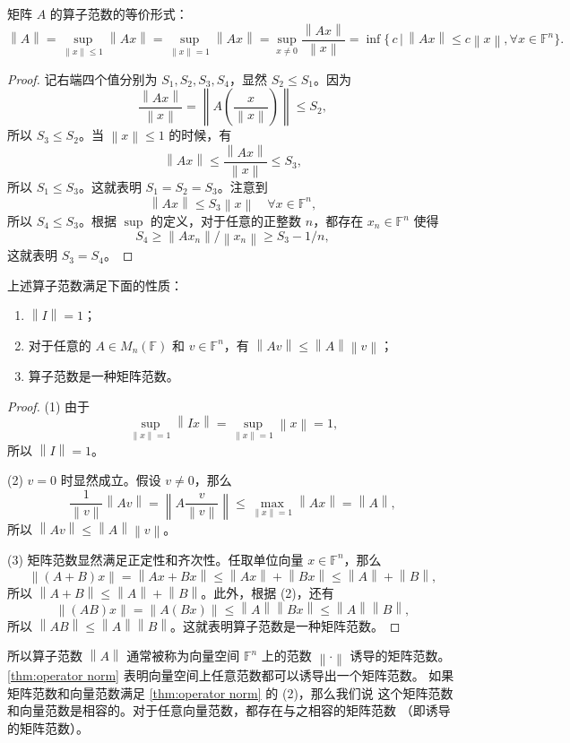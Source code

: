 \documentclass[fontset=none,zihao=-4]{Notes}
\newcommand{\norm}[1]{\left\lVert#1\right\rVert}
\begin{document}
\begin{proposition}
  矩阵 $A$ 的算子范数的等价形式：
  \[
    \norm{A}=\sup_{\norm{x}\leq 1}\norm{A x}=\sup_{\norm{x}=1}\norm{Ax}
    =\sup_{x\neq 0}\frac{\norm{Ax}}{\norm{x}}=\inf\bigl\{\,c\,|\, \norm{Ax}\leq c\norm x,\forall x\in \mathbb{F}^n\bigr\}.
  \]
\end{proposition}
\begin{proof}
  记右端四个值分别为 $S_1,S_2,S_3,S_4$，显然 $S_2\leq S_1$。因为
  \[
    \frac{\norm{Ax}}{\norm x}=\norm{A\left(\frac{x}{\norm x}\right)}\leq S_2,  
  \]
  所以 $S_3\leq S_2$。当 $\norm{x}\leq 1$ 的时候，有
  \[
    \norm{Ax}\leq \frac{\norm{Ax}}{\norm x}\leq S_3,  
  \]
  所以 $S_1\leq S_3$。这就表明 $S_1=S_2=S_3$。注意到
  \[
    \norm{Ax}\leq S_3\norm{x}\quad \forall x\in \mathbb{F}^n,  
  \]
  所以 $S_4\leq S_3$。根据 $\sup$ 的定义，对于任意的正整数 $n$，都存在
  $x_n\in \mathbb{F}^n$ 使得
  \[
    S_4\geq \norm{Ax_n}/\norm{x_n}\geq S_3-1/n,  
  \]
  这就表明 $S_3=S_4$。
\end{proof}

\begin{theorem}\label{thm:operator norm}
  上述算子范数满足下面的性质：
  \begin{enumerate}
    \item $\norm{I}=1$；
    \item 对于任意的 $A\in M_n(\mathbb{F})$ 和 $v\in\mathbb{F}^n$，有
    $\norm{Av}\leq\norm{A}\norm{v}$；
    \item 算子范数是一种矩阵范数。
  \end{enumerate}
\end{theorem}
\begin{proof}
  (1) 由于
  \[
    \sup_{\norm{x}=1}\norm{Ix}=\sup_{\norm{x}=1}\norm{x}=1,  
  \]
  所以 $\norm{I}=1$。

  (2) $v=0$ 时显然成立。假设 $v\neq 0$，那么
  \[
    \frac{1}{\norm{v}}\norm{Av}=\norm{A\frac{v}{\norm{v}}}\leq\max_{\norm{x}=1}\norm{Ax}=\norm{A},  
  \]
  所以 $\norm{Av}\leq\norm{A}\norm{v}$。

  (3) 矩阵范数显然满足正定性和齐次性。任取单位向量 $x\in\mathbb{F}^n$，那么
  \[
    \norm{(A+B)x}=\norm{Ax+Bx}\leq\norm{Ax}+\norm{Bx}\leq\norm{A}+\norm{B},  
  \]
  所以 $\norm{A+B}\leq\norm{A}+\norm{B}$。此外，根据 (2)，还有
  \[
    \norm{(AB)x}=\norm{A(Bx)}\leq \norm{A}\norm{Bx}\leq\norm{A}\norm{B},  
  \]
  所以 $\norm{AB}\leq\norm{A}\norm{B}$。这就表明算子范数是一种矩阵范数。
\end{proof}

所以算子范数 $\norm{A}$ 通常被称为向量空间 $\mathbb{F}^n$ 上的范数 $\norm{\cdot}$ 诱导的矩阵范数。
\autoref{thm:operator norm} 表明向量空间上任意范数都可以诱导出一个矩阵范数。
如果矩阵范数和向量范数满足 \autoref{thm:operator norm} 的 (2)，那么我们说
这个矩阵范数和向量范数是相容的。对于任意向量范数，都存在与之相容的矩阵范数
（即诱导的矩阵范数）。
\end{document}
